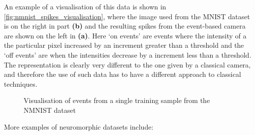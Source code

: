 An example of a visualisation of this data is shown in \autoref{fig:nmnist_spikes_visualisation}, where the image used from the MNIST dataset is on the right in part \textbf{(b)} and the resulting spikes from the event-based camera are shown on the left in \textbf{(a)}. Here `on events' are events where the intensity of a the particular pixel increased by an increment greater than a threshold and the `off events' are when the intensities decrease by a increment less than a threshold. The representation is clearly very different to the one given by a classical camera, and therefore the use of such data has to have a different approach to classical techniques.

\begin{figure}[htb]%
      \centering
      \qquad
      \caption{Visualisation of events from a single training sample from the NMNIST dataset}%
      \label{fig:nmnist_spikes_visualisation}%
\end{figure}

More examples of neuromorphic datasets include:

